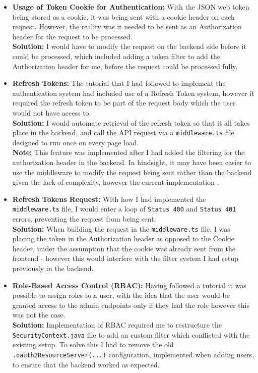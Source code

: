 \documentclass[]{final_report}
\begin{document}
\begin{itemize}
	\item \textbf{Usage of Token Cookie for Authentication:} With the JSON web token being stored as a cookie, it was being sent with a cookie header on each request. However, the reality was it needed to be sent as an Authorization header for the request to be processed.\\ \textbf{Solution:} I would have to modify the request on the backend side before it could be processed, which included adding a token filter to add the Authorization header for me, before the request could be processed fully.
	
	\item \textbf{Refresh Tokens:} The tutorial that I had followed to implement the authentication system had included use of a Refresh Token system, however it required the refresh token to be part of the request body which the user would not have access to.\\ \textbf{Solution:} I would automate retrieval of the refresh token so that it all takes place in the backend, and call the API request via a \verb|middleware.ts| file designed to run once on every page load. \\ \textbf{Note:} This feature was implemented after I had added the filtering for the authorization header in the backend. In hindsight, it may have been easier to use the middleware to modify the request being sent rather than the backend given the lack of complexity, however the current implementation .
	
	\item \textbf{Refresh Tokens Request:} With how I had implemented the \verb|middleware.ts| file, I would enter a loop of \verb|Status 400| and \verb|Status 401| errors, preventing the request from being sent. \\ \textbf{Solution:} When building the request in the \verb|middleware.ts| file, I was placing the token in the Authorization header as opposed to the Cookie header, under the assumption that the cookie was already sent from the frontend - however this would interfere with the filter system I had setup previously in the backend.
	
	\item \textbf{Role-Based Access Control (RBAC):} Having followed a tutorial it was possible to assign roles to a user, with the idea that the user would be granted access to the admin endpoints only if they had the role however this was not the case. \\ \textbf{Solution:} Implementation of RBAC required me to restructure the \verb|SecurityContext.java| file to add an custom filter which conflicted with the existing setup. To solve this I had to remove the old \verb|.oauth2ResourceServer(...)| configuration, implemented when adding users, to ensure that the backend worked as expected.
	
\end{itemize}
\end{document}
